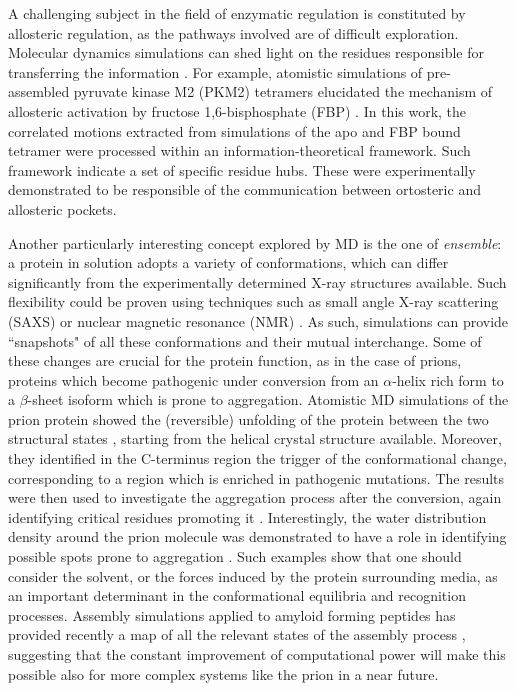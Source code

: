 \documentclass[graybox]{svmult}
\begin{document}
A challenging subject in the field of enzymatic regulation is constituted by allosteric regulation, as the pathways involved are of difficult exploration. Molecular dynamics simulations can shed light on the residues responsible for transferring the information \cite{Pandini2012}.
%
For example, atomistic simulations of pre-assembled pyruvate kinase M2 (PKM2) tetramers elucidated the mechanism of allosteric activation by fructose 1,6-bisphosphate (FBP) \cite{Macpherson2019}. In this work, the correlated motions extracted from simulations of the apo and FBP bound tetramer were processed within an information-theoretical framework. Such framework indicate a set of specific residue hubs. These were experimentally demonstrated to be responsible of the communication between ortosteric and allosteric pockets.

Another particularly interesting concept explored by MD is the one of \emph{ensemble}: a protein in solution adopts a variety of conformations, which can differ significantly from the experimentally determined X-ray structures available.
%
Such flexibility could be proven using techniques such as small angle X-ray scattering (SAXS) or nuclear magnetic resonance (NMR) \cite{Bonomi2017,Kikhney2015,Kleckner2011}. As such, simulations can provide ``snapshots" of all these conformations and their mutual interchange.
%
Some of these changes are crucial for the protein function, as in the case of prions, proteins which become pathogenic under conversion from an $\alpha$-helix rich form to a $\beta$-sheet isoform which is prone to aggregation. 
Atomistic MD simulations of the prion protein showed the (reversible) unfolding of the protein between the two structural states \cite{Chakroun2013}, starting from the helical crystal structure available. Moreover, they identified in the C-terminus region the trigger of the conformational change, corresponding to a region which is enriched in pathogenic mutations. The results were then used to investigate the aggregation process after the conversion, again identifying critical residues promoting it \cite{Collu2018}. 
Interestingly, the water distribution density around the prion molecule was demonstrated to have a role in identifying possible spots prone to aggregation \cite{DeSimone2005,DeSimone2006}. Such examples show that one should consider the solvent, or the forces induced by the protein surrounding media, as an important determinant in the conformational equilibria and recognition processes.
%
Assembly simulations applied to amyloid forming peptides has provided recently a map of all the relevant states of the assembly process \cite{Sengupta2019}, suggesting that the constant improvement of computational power will make this possible also for more complex systems like the prion in a near future.
\end{document}
